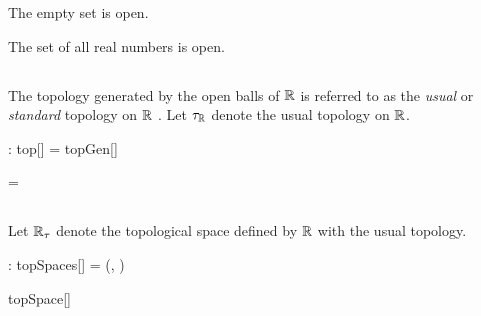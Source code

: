 \documentclass{amsart}
\begin{document}
\begin{remark}
The empty set is open.

\begin{zed}
	\emptyset \in \openR
\end{zed}

\end{remark}

\begin{remark}
The set of all real numbers is open.

\begin{zed}
	\R \in \openR
\end{zed}

\end{remark}

\subsection{}

The topology generated by the open balls of $\mathbb{R}$ is referred to as the {\it usual} or {\it standard} topology on $\mathbb{R}$ .
Let $\tau_{\mathbb{R}}$ denote the usual topology on $\mathbb{R}$.

\begin{axdef}
	\tauR: top[\R]
\where
	\tauR = topGen[\R] \ballsR
\end{axdef}

\begin{remark}

\begin{zed}
	\tauR = \openR
\end{zed}

\end{remark}

\subsection{}

Let $\mathbb{R}_\tau$ denote the topological space defined by $\mathbb{R}$ with the usual topology.

\begin{axdef}
	\Rtau: topSpaces[\R]
\where
	\Rtau = (\R, \tauR)
\end{axdef}

\begin{example}

\begin{zed}
	\Rtau \in topSpace[\R]
\end{zed}

\end{example}
\end{document}
